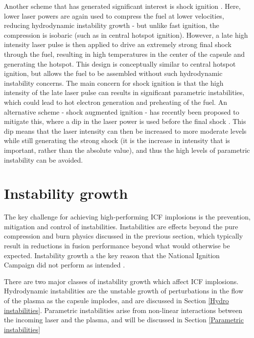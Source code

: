 Another scheme that has generated significant interest is shock ignition \cite{Betti2007}. Here, lower laser powers are again used to compress the fuel at lower velocities, reducing hydrodynamic instability growth - but unlike fast ignition, the compression is isobaric (such as in central hotspot ignition). However, a late high intensity laser pulse is then applied to drive an extremely strong final shock through the fuel, resulting in high temperatures in the center of the capsule and generating the hotspot. This design is conceptually similar to central hotspot ignition, but allows the fuel to be assembled without such hydrodynamic instability concerns. The main concern for shock ignition is that the high intensity of the late laser pulse can results in significant parametric instabilities, which could lead to hot electron generation and preheating of the fuel. An alternative scheme - shock augmented ignition - has recently been proposed to mitigate this, where a dip in the laser power is used before the final shock \cite{Scott2022}. This dip means that the laser intensity can then be increased to more moderate levels while still generating the strong shock (it is the increase in intensity that is important, rather than the absolute value), and thus the high levels of parametric instability can be avoided.







\section{Instability growth}
The key challenge for achieving high-performing ICF implosions is the prevention, mitigation and control of instabilities. Instabilities are effects beyond the pure compression and burn physics discussed in the previous section, which typically result in reductions in fusion performance beyond what would otherwise be expected. Instability growth a the key reason that the National Ignition Campaign did not perform as intended \cite{Lindl2014, Hurricane2014}.

There are two major classes of instability growth which affect ICF implosions. Hydrodynamic instabilities are the unstable growth of perturbations in the flow of the plasma as the capsule implodes, and are discussed in Section \ref{Hydro instabilities}. Parametric instabilities arise from non-linear interactions between the incoming laser and the plasma, and will be discussed in Section \ref{Parametric instabilities}

